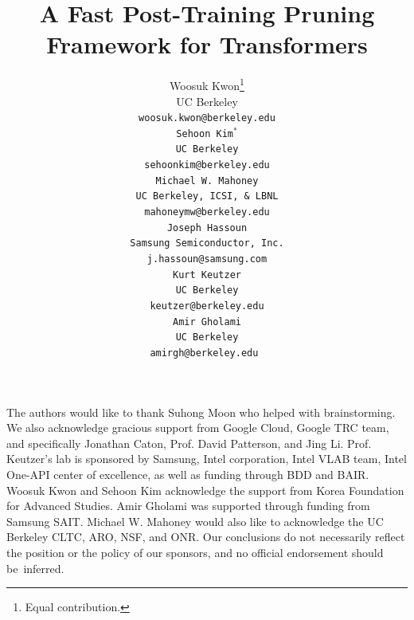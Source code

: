 \documentclass{article}
\title{A Fast Post-Training Pruning Framework for Transformers}
\author{%
  Woosuk Kwon\thanks{Equal contribution.} \\
  UC Berkeley \\
  \tt{woosuk.kwon@berkeley.edu} \\
  \And
  Sehoon Kim$^\ast$ \\
  UC Berkeley \\
  \tt{sehoonkim@berkeley.edu} \\
  \And 
  Michael W. Mahoney \\
  UC Berkeley, ICSI, \& LBNL \\
  \tt{mahoneymw@berkeley.edu} \\
  \And
  Joseph Hassoun \\
  Samsung Semiconductor, Inc. \\
  \tt{j.hassoun@samsung.com} \\
  \And
  Kurt Keutzer \\
  UC Berkeley \\
  \tt{keutzer@berkeley.edu} \\
  \And
  Amir Gholami \\
  UC Berkeley \\
  \tt{amirgh@berkeley.edu}
}
\begin{document}
\maketitle

\setcounter{footnote}{0}








\begin{ack}
\vspace{-2mm}
The authors would like to thank Suhong Moon who helped with brainstorming.
We also acknowledge gracious support from 
Google Cloud, Google TRC team, and specifically Jonathan Caton, Prof. David Patterson,
and Jing Li.
Prof. Keutzer's lab is sponsored by Samsung, Intel corporation, Intel VLAB team, Intel One-API center of
excellence, as well as funding through BDD and BAIR.
Woosuk Kwon and Sehoon Kim acknowledge the support from Korea Foundation for Advanced Studies.
Amir Gholami was supported through funding from Samsung SAIT.
Michael W. Mahoney would also like to acknowledge the UC Berkeley CLTC, ARO, NSF, and ONR.
Our conclusions do not necessarily reflect the position or the policy of our sponsors, and no official endorsement should be~inferred.
\end{ack}

{
\small


}

\clearpage

\appendix


\end{document}
